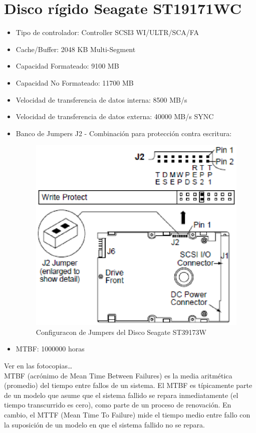 \documentclass[a4paper]{article}
\begin{document}
\section{Disco rígido Seagate ST19171WC}
\begin{itemize}
\item Tipo de controlador: Controller SCSI3 WI/ULTR/SCA/FA
\item Cache/Buffer: 2048 KB Multi-Segment
\item Capacidad Formateado: 9100 MB
\item Capacidad No Formateado: 11700 MB
\item Velocidad de transferencia de datos interna: 8500 MB/s 
\item Velocidad de transferencia de datos externa: 40000 MB/s SYNC
\item Banco de Jumpers J2 - Combinación para protección contra escritura:
\begin{figure} \begin{center}
\includegraphics[scale=1]{imgs/pinesst19171wc.eps} 
\caption{Configuracon de Jumpers del Disco Seagate ST39173W}
\end{center}
\end{figure}
\item MTBF: 1000000 horas
\end{itemize}

Ver en las fotocopias…
\\
MTBF (acrónimo de Mean Time Between Failures) es la media aritmética (promedio) del tiempo entre fallos de un sistema. El MTBF es típicamente parte de un modelo que asume que el sistema fallido se repara inmediatamente (el tiempo transcurrido es cero), como parte de un proceso de renovación. En cambio, el MTTF (Mean Time To Failure) mide el tiempo medio entre fallo con la suposición de un modelo en que el sistema fallido no se repara.
%
\end{document}
